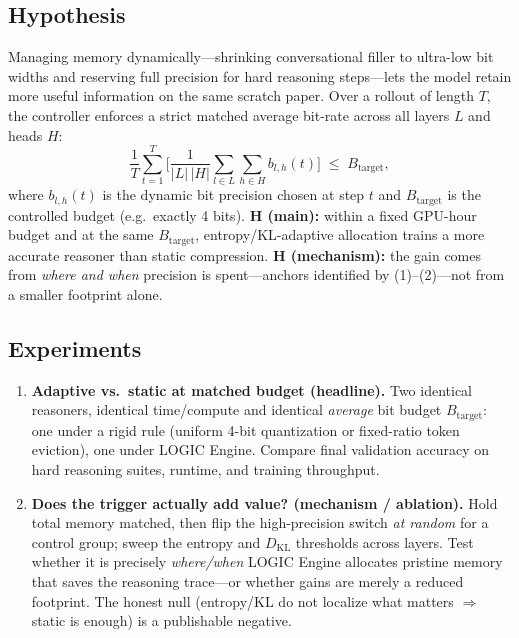 \documentclass[11pt]{article}
\begin{document}
\subsection{Hypothesis}
Managing memory dynamically---shrinking conversational filler to ultra-low bit widths
and reserving full precision for hard reasoning steps---lets the model retain more useful
information on the same scratch paper. Over a rollout of length $T$, the controller
enforces a strict matched average bit-rate across all layers $L$ and heads $H$:
\[
\frac{1}{T}\sum_{t=1}^{T}\Bigg[\frac{1}{|L|\,|H|}\sum_{l\in L}\sum_{h\in H} b_{l,h}(t)\Bigg]
\;\le\; B_{\mathrm{target}}, \tag{3}
\]
where $b_{l,h}(t)$ is the dynamic bit precision chosen at step $t$ and $B_{\mathrm{target}}$
is the controlled budget (e.g.\ exactly 4 bits). \textbf{H (main):} within a fixed
GPU-hour budget and at the same $B_{\mathrm{target}}$, entropy/KL-adaptive allocation
trains a more accurate reasoner than static compression. \textbf{H (mechanism):} the gain
comes from \emph{where and when} precision is spent---anchors identified by (1)--(2)---not
from a smaller footprint alone.

\subsection{Experiments}
\begin{enumerate}[leftmargin=1.4em,itemsep=2pt]
  \item \textbf{Adaptive vs.\ static at matched budget (headline).} Two identical
    reasoners, identical time/compute and identical \emph{average} bit budget
    $B_{\mathrm{target}}$: one under a rigid rule (uniform 4-bit quantization or
    fixed-ratio token eviction), one under LOGIC Engine. Compare final validation
    accuracy on hard reasoning suites, runtime, and training throughput.
  \item \textbf{Does the trigger actually add value? (mechanism / ablation).} Hold total
    memory matched, then flip the high-precision switch \emph{at random} for a control
    group; sweep the entropy and $D_{\mathrm{KL}}$ thresholds across layers. Test whether
    it is precisely \emph{where/when} LOGIC Engine allocates pristine memory that saves
    the reasoning trace---or whether gains are merely a reduced footprint. The honest
    null (entropy/KL do not localize what matters $\Rightarrow$ static is enough) is a
    publishable negative.
\end{enumerate}
\end{document}

